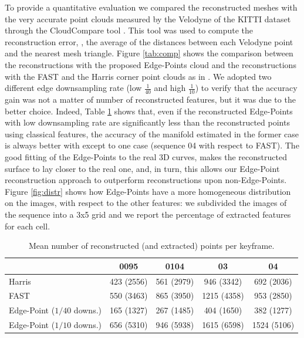 To provide a quantitative evaluation we compared the reconstructed meshes with the very accurate point clouds measured by the Velodyne of the KITTI dataset through the CloudCompare tool \cite{cloudcompare}.
This tool was used to compute the reconstruction error, \ie, the average of the distances between each Velodyne point and the nearest mesh triangle.
Figure \ref{tab:comp} shows the comparison between the reconstructions with the proposed Edge-Points cloud and the reconstructions with the FAST and the Harris corner point clouds as in \cite{litvinov_Lhiuller14}.  
We adopted two different edge downsampling rate (low $\frac{1}{40}$ and high $\frac{1}{10}$) to verify that the accuracy gain was not a matter of number of reconstructed features, but it was due to the better choice. 
Indeed, Table \ref{tab:reconstrPt} shows that, even if the reconstructed Edge-Points with low downsampling rate are significantly less than the reconstructed points using classical features, the accuracy of the manifold estimated in the former case is always better with except to one case (sequence 04 with respect to FAST).  
The good fitting of the Edge-Points to the real 3D curves, makes the reconstructed surface to lay closer to the real one, and, in turn, this allows our Edge-Point reconstruction approach to outperform reconstructions upon non-Edge-Points.
Figure \ref{fig:distr} shows how Edge-Points have a more homogeneous distribution on the images, with respect to the other features: we subdivided the images of the sequence into a 3x5 grid and we report the percentage of extracted features for each cell.


\begin{table}[t]
  \caption{Mean number of reconstructed (and extracted) points per keyframe.}
    \label{tab:reconstrPt}
   \centering
   \begin{tabular}{p{}cccc}
   \toprule 
                                              & 0095            & 0104        &  03         & 04   \\
   \hline   
   {Harris}                                   & 423 (2556)      & 561 (2979)  & 946 (3342)  & 692 (2036) \\
   {FAST}                                     & 550 (3463)      & 865 (3950)  & 1215 (4358) & 953 (2850) \\
  {Edge-Point (${1}/{40}$ downs.)}   & 165 (1327)      & 267 (1485)  & 404 (1650)  & 382 (1277) \\
   {Edge-Point (${1}/{10}$ downs.)}  & 656 (5310)      & 946 (5938)  & 1615 (6598) & 1524 (5106)  \\
    \bottomrule
  \end{tabular}
  \end{table} 

